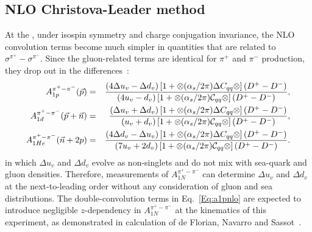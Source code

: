 \subsection{NLO Christova-Leader method}
At the \nloo, under isospin symmetry and charge conjugation invariance, 
the NLO convolution terms become much simpler in quantities that 
are related to $\sigma^{\pi^+} - \sigma^{\pi^-}$. Since the gluon-related terms  
  are identical for  
$\pi^+$ and $\pi^-$ production, they drop out in the differences~\cite{leader2}:
 \begin{eqnarray}
\label{Eq:a1pnlo}
A_{1p}^{\pi^+ - \pi^-}({\vec p}) & = &  { (4 \Delta u_v -\Delta d_v) \left[ 1+ \otimes (\alpha_s/2\pi) \Delta C_{qq}
\otimes \right] (D^+ -D^-) \over { (4 u_v - d_v) \left[ 1+ \otimes (\alpha_s/2\pi) {\cal C}_{qq}
\otimes \right] (D^+ - D^-) } },  \\ 
A_{1d}^{\pi^+ - \pi^-}({\vec p}+ {\vec n}) & = &  { (\Delta u_v + \Delta d_v) \left[ 1+ \otimes (\alpha_s/2\pi) \Delta C_{qq}
\otimes \right] (D^+ -D^-)  \over { (u_v + d_v) \left[ 1+ \otimes (\alpha_s/2\pi) {\cal C}_{qq}
\otimes \right] (D^+ -D^-) } },  \\
A_{1He}^{\pi^+ - \pi^-}({\vec n}+2p) & = &  { (4 \Delta d_v - \Delta u_v) \left[ 1+ \otimes (\alpha_s/2\pi) \Delta C_{qq}
\otimes \right] (D^+ -D^-)  \over { (7 u_v + 2 d_v) \left[ 1+ \otimes (\alpha_s/2\pi) {\cal C}_{qq}
\otimes \right] (D^+ -D^-) } }.
\end{eqnarray}
in which $\Delta u_v$ and $\Delta d_v$ evolve as non-singlets and do not mix with 
sea-quark and gluon densities. Therefore, measurements of $A_{1N}^{\pi^+ - \pi^-}$ 
can determine $\Delta u_v$ and $\Delta d_v$ at the next-to-leading order
without any consideration of gluon and sea distributions.
The double-convolution terms in Eq.~\ref{Eq:a1pnlo} are expected to introduce negligible
$z$-dependency in $A_{1N}^{\pi^+ - \pi^-}$ at the kinematics of this experiment, 
as demonstrated in calculation of de Florian, Navarro and Sassot~\cite{sassotnlo}.

